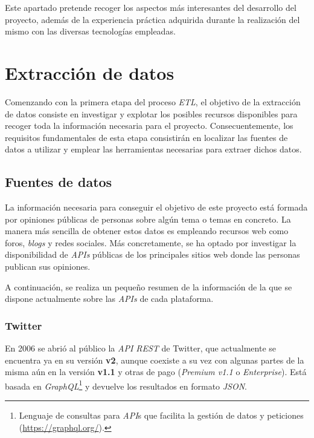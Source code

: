  \label{section:relevant_aspects}

Este apartado pretende recoger los aspectos más interesantes del desarrollo del proyecto, además de la experiencia práctica adquirida durante la
realización del mismo con las diversas tecnologías empleadas.

\section{Extracción de datos} \label{section:data_extraction}

Comenzando con la primera etapa del proceso \textit{ETL}, el objetivo de la extracción de datos consiste en investigar y explotar los posibles recursos disponibles para recoger toda la información necesaria para el proyecto. Consecuentemente, los requisitos fundamentales de esta etapa consistirán en localizar las fuentes de datos a utilizar y emplear las herramientas necesarias para extraer dichos datos.

\subsection{Fuentes de datos}

La información necesaria para conseguir el objetivo de este proyecto está formada por opiniones públicas de personas sobre algún tema o temas en concreto. La manera más sencilla de obtener estos datos es empleando recursos web como foros, \textit{blogs} y redes sociales. Más concretamente, se ha optado por investigar la disponibilidad de \textit{APIs} públicas de los principales sitios web donde las personas publican sus opiniones.

A continuación, se realiza un pequeño resumen de la información de la que se dispone actualmente sobre las \textit{APIs} de cada plataforma.

\subsubsection{Twitter}

En 2006 se abrió al público la \textit{API REST} \cite{twitterGettingStarted} de Twitter, que actualmente se encuentra ya en su versión \textbf{v2}, aunque coexiste a su vez con algunas partes de la misma aún en la versión \textbf{v1.1} y otras de pago (\textit{Premium v1.1} o \textit{Enterprise}). Está basada en \textit{GraphQL}\footnote{Lenguaje de consultas para \textit{API}s que facilita la gestión de datos y peticiones (\url{https://graphql.org/}).} y devuelve los resultados en formato \textit{JSON}.

